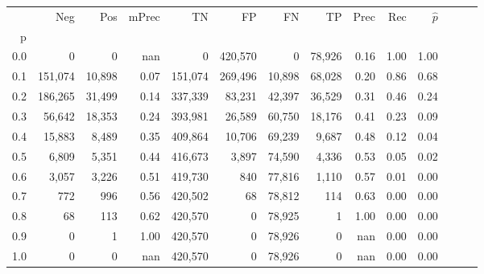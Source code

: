 \begin{tabular}{rrrrrrrrrrrrrr}
\toprule
{} &      Neg &     Pos & mPrec &       TN &       FP &      FN &      TP &  Prec &   Rec & $\hat{p}$ \\
p   &          &         &       &          &          &         &         &       &       &           \\
\midrule
0.0 &        0 &       0 &   nan &        0 &  420,570 &       0 &  78,926 &  0.16 &  1.00 &      1.00 \\
0.1 &  151,074 &  10,898 &  0.07 &  151,074 &  269,496 &  10,898 &  68,028 &  0.20 &  0.86 &      0.68 \\
0.2 &  186,265 &  31,499 &  0.14 &  337,339 &   83,231 &  42,397 &  36,529 &  0.31 &  0.46 &      0.24 \\
0.3 &   56,642 &  18,353 &  0.24 &  393,981 &   26,589 &  60,750 &  18,176 &  0.41 &  0.23 &      0.09 \\
0.4 &   15,883 &   8,489 &  0.35 &  409,864 &   10,706 &  69,239 &   9,687 &  0.48 &  0.12 &      0.04 \\
0.5 &    6,809 &   5,351 &  0.44 &  416,673 &    3,897 &  74,590 &   4,336 &  0.53 &  0.05 &      0.02 \\
0.6 &    3,057 &   3,226 &  0.51 &  419,730 &      840 &  77,816 &   1,110 &  0.57 &  0.01 &      0.00 \\
0.7 &      772 &     996 &  0.56 &  420,502 &       68 &  78,812 &     114 &  0.63 &  0.00 &      0.00 \\
0.8 &       68 &     113 &  0.62 &  420,570 &        0 &  78,925 &       1 &  1.00 &  0.00 &      0.00 \\
0.9 &        0 &       1 &  1.00 &  420,570 &        0 &  78,926 &       0 &   nan &  0.00 &      0.00 \\
1.0 &        0 &       0 &   nan &  420,570 &        0 &  78,926 &       0 &   nan &  0.00 &      0.00 \\
\bottomrule
\end{tabular}
